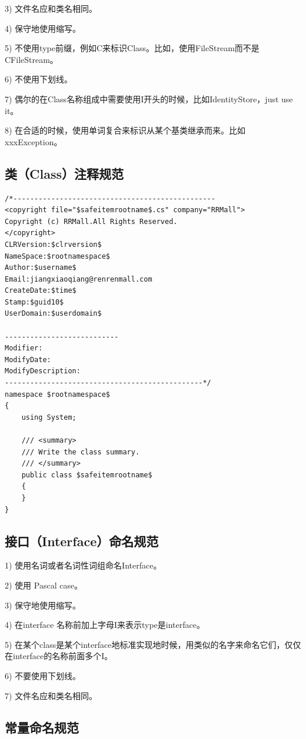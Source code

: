 \documentclass{book}
\begin{document}
3)  文件名应和类名相同。

4)  保守地使用缩写。

5)  不使用type前缀，例如C来标识Class。比如，使用FileStream而不是CFileStream。

6)  不使用下划线。

7)  偶尔的在Class名称组成中需要使用I开头的时候，比如IdentityStore，just use it。

8)  在合适的时候，使用单词复合来标识从某个基类继承而来。比如xxxException。

\subsection{类（Class）注释规范}\label{ClassNamingSpecification}

\begin{lstlisting}[language={[Sharp]C}]
/*------------------------------------------------
<copyright file="$safeitemrootname$.cs" company="RRMall">
Copyright (c) RRMall.All Rights Reserved.
</copyright>
CLRVersion:$clrversion$
NameSpace:$rootnamespace$ 
Author:$username$
Email:jiangxiaoqiang@renrenmall.com
CreateDate:$time$
Stamp:$guid10$
UserDomain:$userdomain$

---------------------------
Modifier:
ModifyDate:
ModifyDescription:
-----------------------------------------------*/
namespace $rootnamespace$
{
	using System;
	
	/// <summary>
    /// Write the class summary. 
    /// </summary>
    public class $safeitemrootname$
    {
    }
}		
\end{lstlisting}

\subsection{接口（Interface）命名规范}

1)  使用名词或者名词性词组命名Interface。

2)  使用 Pascal case。

3)  保守地使用缩写。

4)  在interface 名称前加上字母I来表示type是interface。

5)  在某个class是某个interface地标准实现地时候，用类似的名字来命名它们，仅仅在interface的名称前面多个I。

6)  不要使用下划线。

7)  文件名应和类名相同。

\subsection{常量命名规范}
\end{document}
